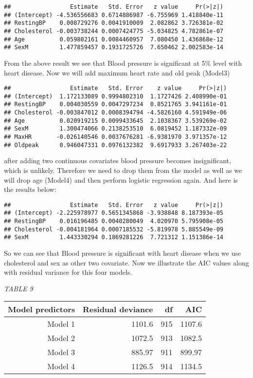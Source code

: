 \documentclass[
]{article}
\begin{document}
\begin{verbatim}
##                 Estimate   Std. Error   z value     Pr(>|z|)
## (Intercept) -4.536556683 0.6714886987 -6.755969 1.418840e-11
## RestingBP    0.008729276 0.0041910009  2.082862 3.726381e-02
## Cholesterol -0.003738244 0.0007424775 -5.034825 4.782861e-07
## Age          0.059802161 0.0084460957  7.080450 1.436868e-12
## SexM         1.477859457 0.1931725726  7.650462 2.002583e-14
\end{verbatim}

From the above result we see that Blood pressure is significant at 5\%
level with heart disease. Now we will add maximum heart rate and old
peak (Model3)

\begin{verbatim}
##                 Estimate   Std. Error    z value     Pr(>|z|)
## (Intercept)  1.172133089 0.9994802310  1.1727426 2.408990e-01
## RestingBP    0.004030559 0.0047297234  0.8521765 3.941161e-01
## Cholesterol -0.003847012 0.0008394794 -4.5826160 4.591949e-06
## Age          0.020919215 0.0099433645  2.1038367 3.539269e-02
## SexM         1.300474066 0.2138253510  6.0819452 1.187332e-09
## MaxHR       -0.026140546 0.0037676281 -6.9381970 3.971357e-12
## Oldpeak      0.946047331 0.0976132382  9.6917933 3.267403e-22
\end{verbatim}

after adding two continuous covariates blood pressure becomes
insignificant, which is unlikely. Therefore we need to drop them from
the model as well as we will drop age (Model4) and then perform logistic
regression again. And here is the results below:

\begin{verbatim}
##                 Estimate   Std. Error   z value     Pr(>|z|)
## (Intercept) -2.225978977 0.5651345868 -3.938848 8.187393e-05
## RestingBP    0.016196485 0.0040280049  4.020970 5.795908e-05
## Cholesterol -0.004181964 0.0007185532 -5.819978 5.885549e-09
## SexM         1.443330294 0.1869281226  7.721312 1.151386e-14
\end{verbatim}

So we can see that Blood pressure is significant with heart disease when
we use cholesterol and sex as other two covariate. Now we illustrate the
AIC values along with residual variance for this four models.

\emph{TABLE 9}

\begin{longtable}[]{@{}rrrr@{}}
\toprule\noalign{}
Model predictors & Residual deviance & df & AIC \\
\midrule\noalign{}
\endhead
\bottomrule\noalign{}
\endlastfoot
Model 1 & 1101.6 & 915 & 1107.6 \\
Model 2 & 1072.5 & 913 & 1082.5 \\
Model 3 & 885.97 & 911 & 899.97 \\
Model 4 & 1126.5 & 914 & 1134.5 \\
\end{longtable}
\end{document}
